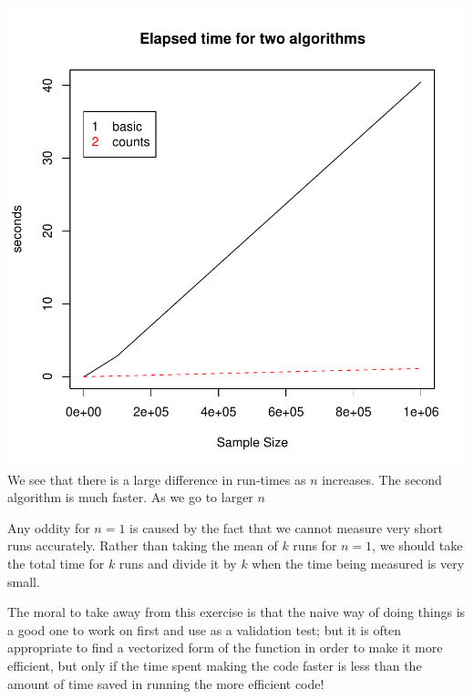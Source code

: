 \includegraphics{RNG/images/algorithmTimes.pdf}
We see that there is a large difference in run-times as $n$ increases.
The second algorithm is much faster.
As we go to larger $n$

Any oddity for $n = 1$ is caused by the fact that we cannot measure
very short runs accurately. Rather than taking the mean of
$k$ runs for $n = 1$, we should take the total time
for $k$ runs and divide it by $k$ when the time being measured
is very small.


The moral to take away from this exercise is that the naive way of
doing things is a good one to work on first and use as a validation
test; but it is often appropriate to find a vectorized form of the
function in order to make it more efficient, but only if the time
spent making the code faster is less than the amount of time saved in
running the more efficient code!


